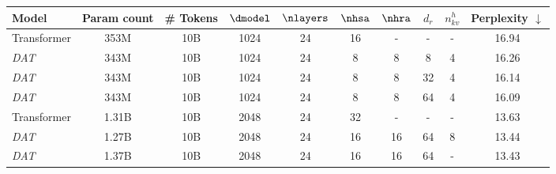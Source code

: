 \begin{tabular}{@{}lcc|cccccc|c@{}}
    \toprule
    Model        & Param count   & \# Tokens &$\dmodel$&$\nlayers$& $\nhsa$  & $\nhra$ & $d_r$ & $n_{kv}^{h}$ & Perplexity $\downarrow$ \\ \midrule\hline
    Transformer  & 353M   & 10B       & 1024    & 24       & 16       & -        & -     & -           & 16.94     \\
    \textit{DAT} & 343M   & 10B       & 1024    & 24       & 8        & 8        & 8    & 4           & 16.26     \\
    \textit{DAT} & 343M   & 10B       & 1024    & 24       & 8        & 8        & 32    & 4           & 16.14     \\
    \textit{DAT} & 343M   & 10B       & 1024    & 24       & 8        & 8        & 64    & 4           & 16.09     \\
    Transformer  & 1.31B  & 10B       & 2048    & 24       & 32       & -        & -     & -           & 13.63     \\
    \textit{DAT} & 1.27B  & 10B       & 2048    & 24       & 16       & 16       & 64    & 8           & 13.44     \\
    \textit{DAT} & 1.37B  & 10B       & 2048    & 24       & 16       & 16       & 64    & -          & 13.43     \\ \bottomrule
\end{tabular}%
